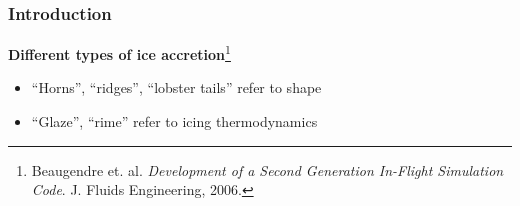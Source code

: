 \documentclass[9pt]{beamer}
\begin{document}
\begin{frame}
\frametitle{Introduction}
\label{sec-1-8}

\textbf{Different types of ice accretion}\footnote{Beaugendre et. al. \emph{Development of a Second Generation In-Flight Simulation Code}. J. Fluids Engineering, 2006.
 }
\begin{itemize}
\item ``Horns'', ``ridges'', ``lobster tails'' refer to shape
\item ``Glaze'', ``rime'' refer to icing thermodynamics
\end{itemize}

\vspace*{-0.0cm}\begin{figure}
 
\end{figure}
\end{frame}
\end{document}
